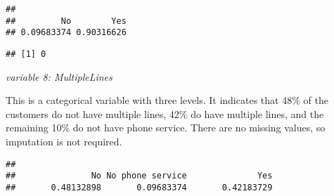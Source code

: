 \documentclass[
  a4paper]{article}
\newenvironment{Shaded}{\begin{snugshade}}{\end{snugshade}}
\newcommand{\CommentTok}[1]{\textcolor[rgb]{0.56,0.35,0.01}{\textit{#1}}}
\newcommand{\FunctionTok}[1]{\textcolor[rgb]{0.13,0.29,0.53}{\textbf{#1}}}
\newcommand{\NormalTok}[1]{#1}
\newcommand{\SpecialCharTok}[1]{\textcolor[rgb]{0.81,0.36,0.00}{\textbf{#1}}}
\begin{document}
\begin{Shaded}
\end{Shaded}

\begin{verbatim}
## 
##         No        Yes 
## 0.09683374 0.90316626
\end{verbatim}

\begin{Shaded}
\end{Shaded}

\begin{verbatim}
## [1] 0
\end{verbatim}

\emph{variable 8: MultipleLines}

This is a categorical variable with three levels. It indicates that 48\%
of the customers do not have multiple lines, 42\% do have multiple
lines, and the remaining 10\% do not have phone service. There are no
missing values, so imputation is not required.

\begin{Shaded}
\end{Shaded}

\begin{verbatim}
## 
##               No No phone service              Yes 
##       0.48132898       0.09683374       0.42183729
\end{verbatim}

\begin{Shaded}
\end{Shaded}
\end{document}
